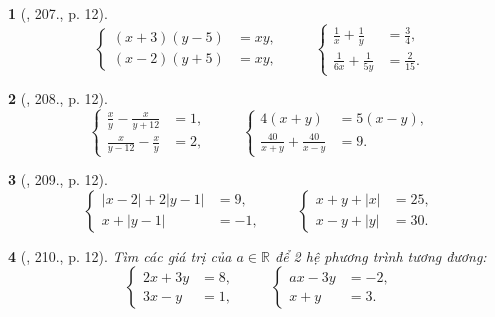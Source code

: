 \documentclass{article}
\newtheorem{baitoan}{}
\begin{document}
\begin{baitoan}[\cite{Binh_Toan_9_tap_2}, 207., p. 12]
	\begin{equation*}
		\left\{\begin{split}
			(x + 3)(y - 5) &= xy,\\
			(x - 2)(y + 5) &= xy,
		\end{split}\right.\hspace{1cm} \left\{\begin{split}
			\frac{1}{x}	+ \frac{1}{y} &= \frac{3}{4},\\
			\frac{1}{6x} + \frac{1}{5y} &= \frac{2}{15}.
		\end{split}\right. 
	\end{equation*}
\end{baitoan}

\begin{baitoan}[\cite{Binh_Toan_9_tap_2}, 208., p. 12]
	\begin{equation*}
		\left\{\begin{split}
			\frac{x}{y} - \frac{x}{y + 12} &= 1,\\
			\frac{x}{y - 12} - \frac{x}{y} &= 2,
		\end{split}\right.\hspace{1cm} \left\{\begin{split}
			4(x + y) &= 5(x - y),\\
			\frac{40}{x + y} + \frac{40}{x - y} &= 9.
		\end{split}\right. 
	\end{equation*}
\end{baitoan}

\begin{baitoan}[\cite{Binh_Toan_9_tap_2}, 209., p. 12]
	\begin{equation*}
		\left\{\begin{split}
			|x - 2| + 2|y - 1| &= 9,\\
			x + |y - 1| &= -1,
		\end{split}\right.\hspace{1cm} \left\{\begin{split}
			x + y + |x| &= 25,\\
			x - y + |y| &= 30.
		\end{split}\right. 
	\end{equation*}
\end{baitoan}

\begin{baitoan}[\cite{Binh_Toan_9_tap_2}, 210., p. 12]
	Tìm các giá trị của $a\in\mathbb{R}$ để 2 hệ phương trình tương đương:
	\begin{equation*}
		\left\{\begin{split}
			2x + 3y &= 8,\\
			3x - y &= 1,
		\end{split}\right.\hspace{1cm} \left\{\begin{split}
			ax - 3y &= -2,\\
			x + y &= 3.
		\end{split}\right. 
	\end{equation*}
\end{baitoan}
\end{document}

